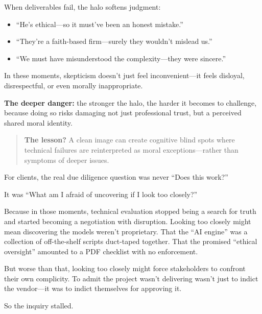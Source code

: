 \begin{tcolorbox}[colback=blue!5!white, colframe=blue!50!black, breakable,
    title={Psychological Sidebar: The Halo Effect — When Virtue in One Domain Shields Vice in Another}]
  When deliverables fail, the halo softens judgment:

  \medskip
  
  \begin{itemize}
      \item “He’s ethical—so it must’ve been an honest mistake.”
      \item “They’re a faith-based firm—surely they wouldn’t mislead us.”
      \item “We must have misunderstood the complexity—they were sincere.”
  \end{itemize}

  \medskip
  
  In these moments, skepticism doesn’t just feel inconvenient—it feels disloyal, disrespectful, or even morally inappropriate.
  
  \medskip
  
  \textbf{The deeper danger:} the stronger the halo, the harder it becomes to challenge, because doing so risks damaging not just professional trust, but a perceived shared moral identity.
  
  \medskip
  
  \begin{quote}
  \textbf{The lesson?} A clean image can create cognitive blind spots where technical failures are reinterpreted as moral exceptions—rather than symptoms of deeper issues.
  \end{quote}
  
\end{tcolorbox}
 
\medskip

For clients, the real due diligence question was never “Does this work?”  

It was “What am I afraid of uncovering if I look too closely?”

Because in those moments, technical evaluation stopped being a search for truth and started becoming a negotiation with disruption.  
Looking too closely might mean discovering the models weren’t proprietary.  
That the “AI engine” was a collection of off-the-shelf scripts duct-taped together.  
That the promised “ethical oversight” amounted to a PDF checklist with no enforcement.  

But worse than that, looking too closely might force stakeholders to confront their own complicity.  
To admit the project wasn’t delivering wasn’t just to indict the vendor—it was to indict themselves for approving it.

So the inquiry stalled.

